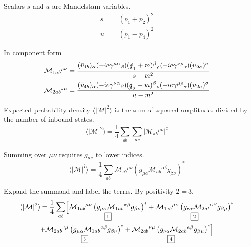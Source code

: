 Scalars $s$ and $u$ are Mandelstam variables.
\begin{align*}
s&=(p_1+p_2)^2
\\
u&=(p_1-p_4)^2
\end{align*}

In component form
\begin{align*}
\mathcal M_{1ab}{}^{\mu\nu}=\frac{
(\bar{u}_{4b})_\alpha
(-ie\gamma^{\mu\alpha}{}_\beta)
(\slashed{q}_1+m)^\beta{}_\rho
(-ie\gamma^{\nu\rho}{}_\sigma)
(u_{2a})^\sigma}{s-m^2}
\\
\mathcal M_{2ab}{}^{\nu\mu}=\frac{
(\bar{u}_{4b})_\alpha
(-ie\gamma^{\nu\alpha}{}_\beta)
(\slashed{q}_2+m)^\beta{}_\rho
(-ie\gamma^{\mu\rho}{}_\sigma)
(u_{2a})^\sigma}{u-m^2}
\end{align*}

Expected probability density $\langle|\mathcal M|^2\rangle$
is the sum of squared amplitudes divided by the number of inbound states.
\begin{equation*}
\langle|\mathcal M|^2\rangle=\frac{1}{4}\sum_{ab}\sum_{\mu\nu}
\bigl|\mathcal M_{ab}{}^{\mu\nu}\bigr|^2
\end{equation*}

Summing over $\mu\nu$ requires $g_{\mu\nu}$ to lower indices.
\begin{equation*}
\langle|\mathcal M|^2\rangle
=\frac{1}{4}\sum_{ab}\mathcal M_{ab}{}^{\mu\nu}
\left(g_{\mu\alpha}\mathcal M_{ab}{}^{\alpha\beta}g_{\beta\nu}\right)^*
\end{equation*}

Expand the summand and label the terms.
By positivity $\boxed{\scriptstyle2}=\boxed{\scriptstyle3}$.
\begin{multline*}
\langle|\mathcal{M}|^2\rangle
=\frac{1}{4}\sum_{ab}\Bigl[
\underset{\boxed{\scriptstyle1}}
{\mathcal M_{1ab}{}^{\mu\nu}\left(g_{\mu\alpha}\mathcal M_{1ab}{}^{\alpha\beta}g_{\beta\nu}\right)^*}
+
\underset{\boxed{\scriptstyle2}}
{\mathcal M_{1ab}{}^{\mu\nu}\left(g_{\nu\alpha}\mathcal M_{2ab}{}^{\alpha\beta}g_{\beta\mu}\right)^*}
\\
+
\underset{\boxed{\scriptstyle3}}
{\mathcal M_{2ab}{}^{\nu\mu}\left(g_{\mu\alpha}\mathcal M_{1ab}{}^{\alpha\beta}g_{\beta\nu}\right)^*}
+
\underset{\boxed{\scriptstyle4}}
{\mathcal M_{2ab}{}^{\nu\mu}\left(g_{\nu\alpha}\mathcal M_{2ab}{}^{\alpha\beta}g_{\beta\mu}\right)^*}
\Bigr]
\end{multline*}

